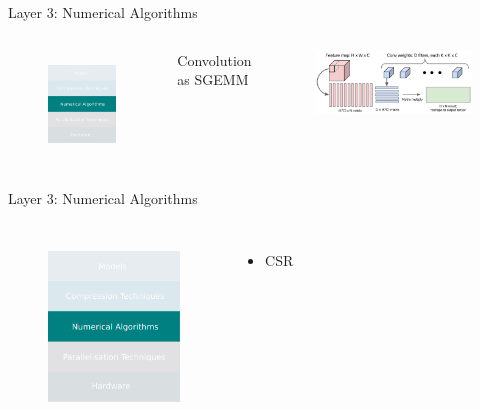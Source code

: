 \documentclass[xcolor=dvipsnames]{beamer}
\begin{document}
\begin{frame}{Layer 3: Numerical Algorithms}

\begin{columns}

\begin{figure}
    \centering
    \includegraphics[width=3.5cm]{images/numericals.pdf}
    \label{fig:inference-stack-nums-2}
\end{figure}


{\large Convolution as SGEMM}

\begin{figure}
    \centering
    \includegraphics[width=8cm]{images/im2col.pdf}
\end{figure}

\end{columns}
\end{frame}


\begin{frame}{Layer 3: Numerical Algorithms}

\begin{columns}


\begin{figure}
    \centering
    \includegraphics[width=3.5cm]{images/numericals.pdf}
    \label{fig:inference-stack-nums-3}
\end{figure}

\begin{itemize}
    \item CSR
\end{itemize}

\end{columns}
\end{frame}
\end{document}

